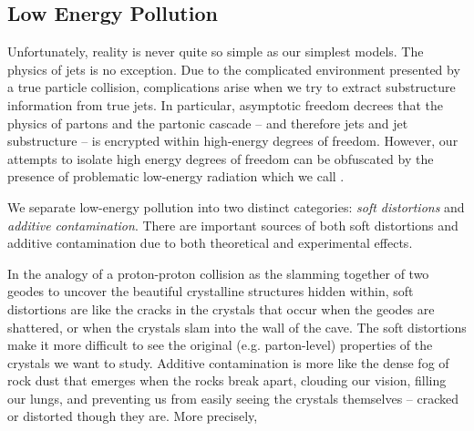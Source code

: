 



\subsection{Low Energy Pollution}
\label{sec:low-energy-pollution}

Unfortunately, reality is never quite so simple as our simplest models.
%
The physics of jets is no exception.
%
Due to the complicated environment presented by a true particle collision, complications arise when we try to extract substructure information from true jets.
%
In particular, asymptotic freedom decrees that the physics of partons and the partonic cascade -- and therefore jets and jet substructure -- is encrypted within high-energy degrees of freedom.
%
However, our attempts to isolate high energy degrees of freedom can be obfuscated by the presence of problematic low-energy radiation which we call .

We separate low-energy pollution into two distinct categories:
%
\textit{soft distortions} and \textit{additive contamination}.
%
There are important sources of both soft distortions and additive contamination due to both theoretical and experimental effects.

In the analogy of a proton-proton collision as the slamming together of two geodes to uncover the beautiful crystalline structures hidden within, soft distortions are like the cracks in the crystals that occur when the geodes are shattered, or when the crystals slam into the wall of the cave.
%
The soft distortions make it more difficult to see the original (e.g. parton-level) properties of the crystals we want to study.
%
Additive contamination is more like the dense fog of rock dust that emerges when the rocks break apart, clouding our vision, filling our lungs, and preventing us from easily seeing the crystals themselves -- cracked or distorted though they are.
%
More precisely,

